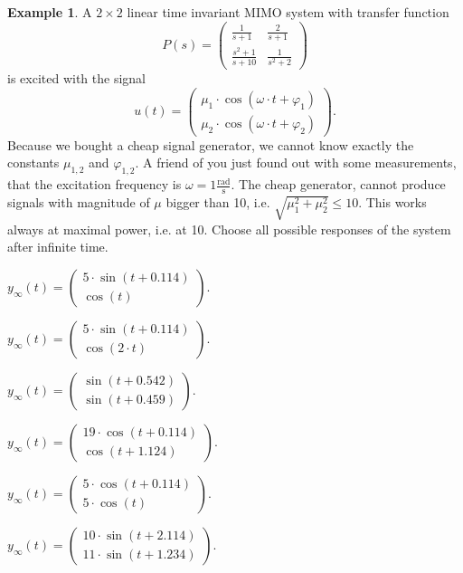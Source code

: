 \documentclass[a4paper,12 pt]{article}
\numberwithin{equation}{section}
\theoremstyle{definition}
\newtheorem{bsp}{Example}
\theoremstyle{remark}
\theoremstyle{definition}
\theoremstyle{definition}
\theoremstyle{definition}
\theoremstyle{remark}
\begin{document}
\newpage
\begin{bsp}
A $2\times 2$ linear time invariant MIMO system with transfer function
\begin{equation*}
P(s)=\begin{pmatrix}
\frac{1}{s+1}&\frac{2}{s+1}\\[6pt]
\frac{s^2+1}{s+10}&\frac{1}{s^2+2}
\end{pmatrix}
\end{equation*}
is excited with the signal
\begin{equation*}
u(t)=\begin{pmatrix}
\mu_1\cdot \cos(\omega \cdot t + \varphi_1)\\
\mu_2\cdot \cos(\omega \cdot t + \varphi_2)
\end{pmatrix}.
\end{equation*}
Because we bought a cheap signal generator, we cannot know exactly the constants $\mu_{1,2}$ and $\varphi_{1,2}$. A friend of you just found out with some measurements, that the excitation frequency is $\omega = 1\frac{\text{rad}}{\text{s}}$. The cheap generator, cannot produce signals with magnitude of $\mu$ bigger than 10, i.e. $\sqrt{\mu_1^2+\mu_2^2}\leq 10$. This works always at maximal power, i.e. at 10. Choose all possible responses of the system after infinite time.
 \begin{todolist}
  \item $y_\infty(t)=\begin{pmatrix} 
5\cdot \sin(t+0.114)\\
\cos(t)
\end{pmatrix}$.
\item $y_\infty(t)=\begin{pmatrix} 
5\cdot \sin(t+0.114)\\
\cos(2\cdot t)
\end{pmatrix}$.
\item $y_\infty(t)=\begin{pmatrix} 
 \sin(t+0.542)\\
\sin(t+0.459)
\end{pmatrix}$.
\item $y_\infty(t)=\begin{pmatrix} 
19\cdot \cos(t+0.114)\\
\cos(t+1.124)
\end{pmatrix}$.
\item $y_\infty(t)=\begin{pmatrix} 
5\cdot \cos(t+0.114)\\
5\cdot \cos(t)
\end{pmatrix}$.
\item $y_\infty(t)=\begin{pmatrix} 
10\cdot \sin(t+2.114)\\
11\cdot \sin(t+1.234)
\end{pmatrix}$.
  \end{todolist}
  

\end{bsp}
\end{document}
